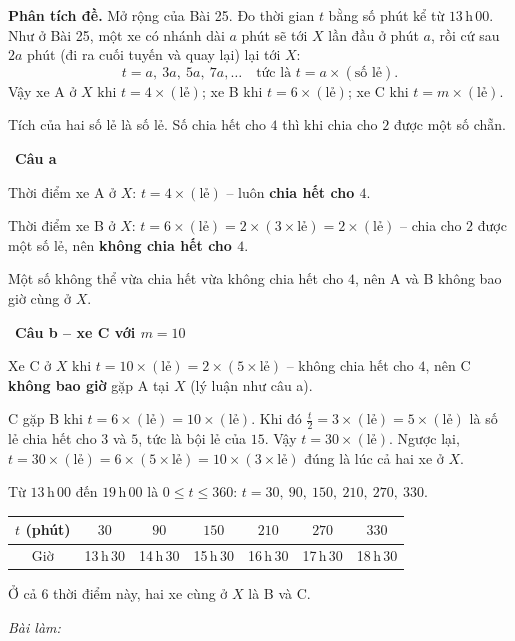 \documentclass[11pt]{article}
\newif\ifsol \solfalse
\newcommand{\StuProb}[2]{\begin{probboxS}{#1}{#2}\StuProbBody\end{probboxS}}
\newcommand{\probsol}[1]{%
  \begin{lrbox}{\solmeasure}\begin{minipage}{\dimexpr\linewidth-24pt\relax}#1\end{minipage}\end{lrbox}%
  \ifsol
    \begin{solbox}#1\end{solbox}%
  \else
    \setlength{\solht}{\dimexpr\ht\solmeasure+\dp\solmeasure+0.85cm\relax}%
    \ifdim\solht<1.35cm\setlength{\solht}{1.35cm}\fi
    \ifdim\solht>\StudentMaxWork\setlength{\solht}{\StudentMaxWork}\fi
    \par\noindent\begin{minipage}{\linewidth}%
    \expandafter\StuProb\StuProbArgs
    \begin{tcolorbox}[colback=white,colframe=Line,boxrule=0.8pt,arc=5pt,
      left=8pt,right=8pt,top=4pt,bottom=4pt,height=\solht]{\footnotesize\color{Slate}\itshape\WorkWord}\end{tcolorbox}%
    \end{minipage}\par\medskip
  \fi}
\newlength{\StudentMaxWork}\setlength{\StudentMaxWork}{4.5cm}
\newcommand{\step}[2]{\par\smallskip\noindent{\bfseries\color{tmBlue!85!black}\StepWord~#1.}\ {\bfseries #2}\par\nopagebreak}
\def\WorkWord{Bài làm:}
\def\StepWord{Bước}
\begin{document}
\probsol{
\textbf{Phân tích đề.} Mở rộng của Bài 25. Đo thời gian $t$ bằng số phút kể từ $13$\,h\,$00$. Như ở Bài 25, một xe có nhánh dài $a$ phút sẽ tới $X$ lần đầu ở phút $a$, rồi cứ sau $2a$ phút (đi ra cuối tuyến và quay lại) lại tới $X$:
\[ t=a,\ 3a,\ 5a,\ 7a,\dots \quad\text{tức là } t=a\times(\text{số lẻ}). \]
Vậy xe A ở $X$ khi $t=4\times(\text{lẻ})$; xe B khi $t=6\times(\text{lẻ})$; xe C khi $t=m\times(\text{lẻ})$.
\begin{recallbox}Tích của hai số lẻ là số lẻ. Số chia hết cho $4$ thì khi chia cho $2$ được một số chẵn.\end{recallbox}

\step{1}{Câu a}
Thời điểm xe A ở $X$: $t=4\times(\text{lẻ})$ -- luôn \textbf{chia hết cho $4$}.\par
Thời điểm xe B ở $X$: $t=6\times(\text{lẻ})=2\times(3\times\text{lẻ})=2\times(\text{lẻ})$ -- chia cho $2$ được một số lẻ, nên \textbf{không chia hết cho $4$}.\par
Một số không thể vừa chia hết vừa không chia hết cho $4$, nên A và B không bao giờ cùng ở $X$.

\step{2}{Câu b -- xe C với $m=10$}
Xe C ở $X$ khi $t=10\times(\text{lẻ})=2\times(5\times\text{lẻ})$ -- không chia hết cho $4$, nên C \textbf{không bao giờ} gặp A tại $X$ (lý luận như câu a).\par
C gặp B khi $t=6\times(\text{lẻ})=10\times(\text{lẻ})$. Khi đó $\frac{t}{2}=3\times(\text{lẻ})=5\times(\text{lẻ})$ là số lẻ chia hết cho $3$ và $5$, tức là bội lẻ của $15$. Vậy $t=30\times(\text{lẻ})$. Ngược lại, $t=30\times(\text{lẻ})=6\times(5\times\text{lẻ})=10\times(3\times\text{lẻ})$ đúng là lúc cả hai xe ở $X$.\par
Từ $13$\,h\,$00$ đến $19$\,h\,$00$ là $0\le t\le 360$: $t=30,\ 90,\ 150,\ 210,\ 270,\ 330$.
\begin{center}
\begin{tabular}{|c|c|c|c|c|c|c|}
\hline
\rowcolor{tmBlue!10}$t$ (phút) & $30$ & $90$ & $150$ & $210$ & $270$ & $330$\\ \hline
Giờ & 13\,h\,30 & 14\,h\,30 & 15\,h\,30 & 16\,h\,30 & 17\,h\,30 & 18\,h\,30\\ \hline
\end{tabular}
\end{center}
Ở cả $6$ thời điểm này, hai xe cùng ở $X$ là B và C.

}
\end{document}
